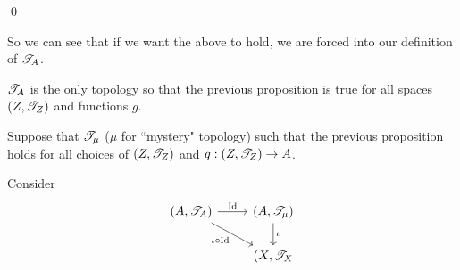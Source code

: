\documentclass[x11names,reqno,14pt]{extarticle}
\begin{document}
\qed

So we can see that if we want the above to hold, we are forced into our definition of $\mathscr{T}_A$. 

\prop

$\mathscr{T}_A$ is the only topology so that the previous proposition is true for all spaces $(Z, \mathscr{T}_Z)$ and functions $g$. 

\proof

Suppose that $\mathscr{T}_{\mu}$ ($\mu$ for ``mystery" topology) such that the previous proposition holds for all choices of $(Z, \mathscr{T}_Z)$ and $g:(Z,\mathscr{T}_Z)\to A$.  

Consider 
\[
\begin{tikzcd}
(A,\ms{T}_A)\arrow[rd, "\iota \circ \Id"'] \arrow[r, "\Id"] & (A, \ms{T}_\mu) \arrow[d, "\iota"] \\
& (X, \ms{T}_X \\
\end{tikzcd}
\]
\end{document}
